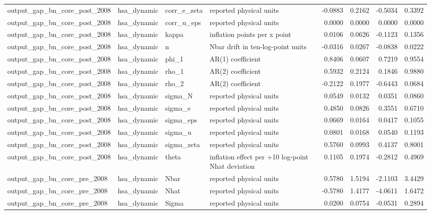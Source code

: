 \begin{tabular}{llllrrrr}
output\_gap\_bn\_core\_post\_2008 & hsa\_dynamic & corr\_e\_zeta & reported physical units & -0.0883 & 0.2162 & -0.5034 & 0.3392 \\
output\_gap\_bn\_core\_post\_2008 & hsa\_dynamic & corr\_u\_eps & reported physical units & 0.0000 & 0.0000 & 0.0000 & 0.0000 \\
output\_gap\_bn\_core\_post\_2008 & hsa\_dynamic & kappa & inflation points per x point & 0.0106 & 0.0626 & -0.1123 & 0.1356 \\
output\_gap\_bn\_core\_post\_2008 & hsa\_dynamic & n & Nbar drift in ten-log-point units & -0.0316 & 0.0267 & -0.0838 & 0.0222 \\
output\_gap\_bn\_core\_post\_2008 & hsa\_dynamic & phi\_1 & AR(1) coefficient & 0.8406 & 0.0607 & 0.7219 & 0.9554 \\
output\_gap\_bn\_core\_post\_2008 & hsa\_dynamic & rho\_1 & AR(2) coefficient & 0.5932 & 0.2124 & 0.1846 & 0.9880 \\
output\_gap\_bn\_core\_post\_2008 & hsa\_dynamic & rho\_2 & AR(2) coefficient & -0.2122 & 0.1977 & -0.6443 & 0.0684 \\
output\_gap\_bn\_core\_post\_2008 & hsa\_dynamic & sigma\_N & reported physical units & 0.0549 & 0.0132 & 0.0351 & 0.0860 \\
output\_gap\_bn\_core\_post\_2008 & hsa\_dynamic & sigma\_e & reported physical units & 0.4850 & 0.0826 & 0.3551 & 0.6710 \\
output\_gap\_bn\_core\_post\_2008 & hsa\_dynamic & sigma\_eps & reported physical units & 0.0669 & 0.0164 & 0.0417 & 0.1055 \\
output\_gap\_bn\_core\_post\_2008 & hsa\_dynamic & sigma\_u & reported physical units & 0.0801 & 0.0168 & 0.0540 & 0.1193 \\
output\_gap\_bn\_core\_post\_2008 & hsa\_dynamic & sigma\_zeta & reported physical units & 0.5760 & 0.0993 & 0.4137 & 0.8001 \\
output\_gap\_bn\_core\_post\_2008 & hsa\_dynamic & theta & inflation effect per +10 log-point Nhat deviation & 0.1105 & 0.1974 & -0.2812 & 0.4969 \\
output\_gap\_bn\_core\_pre\_2008 & hsa\_dynamic & Nbar & reported physical units & 0.5780 & 1.5194 & -2.1103 & 3.4429 \\
output\_gap\_bn\_core\_pre\_2008 & hsa\_dynamic & Nhat & reported physical units & -0.5780 & 1.4177 & -4.0611 & 1.6472 \\
output\_gap\_bn\_core\_pre\_2008 & hsa\_dynamic & Sigma & reported physical units & 0.0200 & 0.0754 & -0.0531 & 0.2894 \\

\end{tabular}
